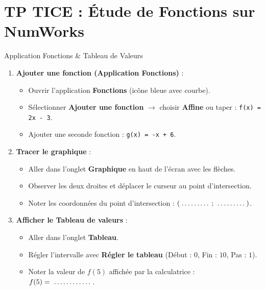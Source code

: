 \section{TP TICE : Étude de Fonctions sur NumWorks}

\begin{tpinfo}{Application Fonctions \& Tableau de Valeurs}
\begin{enumerate}[leftmargin=1.5em, itemsep=2pt]
    \item \textbf{Ajouter une fonction (Application Fonctions)} :
    \begin{itemize}
        \item Ouvrir l'application \textbf{Fonctions} (icône bleue avec courbe).
        \item Sélectionner \textbf{Ajouter une fonction} $\rightarrow$ choisir \textbf{Affine} ou taper : \texttt{f(x) = 2x - 3}.
        \item Ajouter une seconde fonction : \texttt{g(x) = -x + 6}.
    \end{itemize}
    \item \textbf{Tracer le graphique} :
    \begin{itemize}
        \item Aller dans l'onglet \textbf{Graphique} en haut de l'écran avec les flèches.
        \item Observer les deux droites et déplacer le curseur au point d'intersection.
        \item Noter les coordonnées du point d'intersection : $(\pointille[1.5cm]\,;\,\pointille[1.5cm])$.
    \end{itemize}
    \item \textbf{Afficher le Tableau de valeurs} :
    \begin{itemize}
        \item Aller dans l'onglet \textbf{Tableau}.
        \item Régler l'intervalle avec \textbf{Régler le tableau} (Début : $0$, Fin : $10$, Pas : $1$).
        \item Noter la valeur de $f(5)$ affichée par la calculatrice : $f(5) = \pointille[2cm]$.
    \end{itemize}
\end{enumerate}
\end{tpinfo}

